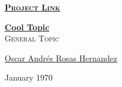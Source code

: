 \documentclass[12pt, fleqn]{report}
\author{Oscar Andrés Rosas}
\begin{document}
\begin{titlepage}
    
    \pagecolor{TitlePageColor}                                      %
    \color{white}                                                   %

    \vspace                                                         %
    \baselineskip                                                   %

    \makebox[0pt][l]{\rule{1.3\textwidth}{3pt}}                     %
    
    \href{ProjectNameLink}                                          %
    {\textbf{\textsc{\Huge Project Link}}}                          %
    \vspace{2.7cm}                                                  %

    \href{ProjectNameLink/Book}                                     %
    {\fontsize{65}{78}\selectfont \textbf{Cool Topic}}\\[0.5cm]     %
    \textcolor{ColorSubtext}{\textsc{\Huge General Topic}}          %
    
    \vfill                                                          %
    
    \href{ProjectAuthorLink}                                        %
    {\LARGE \textsf{Oscar Andrés Rosas Hernandez}}                  %

    \vspace                                                         %
    \baselineskip                                                   %
    
    {\large \textsf{January 1970}}                                  %

\end{titlepage}


\restoregeometry                                                    %
\nopagecolor                                                        %
\end{document}
